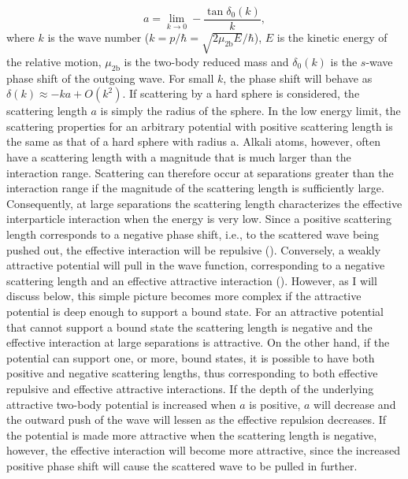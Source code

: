 \begin{equation} \label{eq:2}
a = \lim_{k \to 0} -\frac{\tan\delta_0(k)}{k},
\end{equation}
where $k$ is the wave number ($k=p/\hbar = \sqrt{2\mu_{2\mathrm{b}} E}/\hbar$), $E$ is the kinetic energy of the relative motion, $\mu_{2\mathrm{b}}$ is the two-body reduced mass and $\delta_0(k)$ is the $s$-wave phase shift of the outgoing wave. For small $k$, the phase shift will behave as $\delta(k)\approx-ka + O(k^2)$. If scattering by a hard sphere is considered, the scattering length $a$ is simply the radius of the sphere. In the low energy limit, the scattering properties for an arbitrary potential with positive scattering length is the same as that of a hard sphere with radius a. Alkali atoms, however, often have a scattering length with a magnitude that is much larger than the interaction range. Scattering can therefore occur at separations greater than the interaction range if the magnitude of the scattering length is sufficiently large. Consequently, at large separations the scattering length characterizes the effective interparticle interaction when the energy is very low. Since a positive scattering length corresponds to a negative phase shift, i.e., to the scattered wave being pushed out, the effective interaction will be repulsive (). Conversely, a weakly attractive potential will pull in the wave function, corresponding to a negative scattering length and an effective attractive interaction (). However, as I will discuss below, this simple picture becomes more complex if the attractive potential is deep enough to support a bound state. For an attractive potential that cannot support a bound state the scattering length is negative and the effective interaction at large separations is attractive. On the other hand, if the potential can support one, or more, bound states, it is possible to have both positive and negative scattering lengths, thus corresponding to both effective repulsive and effective attractive interactions. If the depth of the underlying attractive two-body potential is increased when $a$ is positive, $a$ will decrease and the outward push of the wave will lessen as the effective repulsion decreases. If the potential is made more attractive when the scattering length is negative, however, the effective interaction will become more attractive, since the increased positive phase shift will cause the scattered wave to be pulled in further. 

